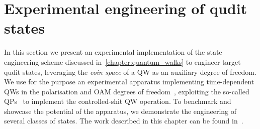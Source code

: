 
\chapter{Experimental engineering of qudit states}
\label{chapter:experimental_engineering_qudits}

 In this section we present an experimental implementation of the state engineering scheme discussed in~\cref{chapter:quantum_walks} to engineer target qudit states, leveraging the \emph{coin space} of a \ac{QW} as an auxiliary degree of freedom.
We use for the purpose an experimental apparatus implementing time-dependent \acp{QW} in the polarisation and \ac{OAM} degrees of freedom~\cite{zhang2010implementation,goyal2013implementing,cardano2015quantum}, exploiting the so-called \acp{QP}~\cite{marrucci2006optical} to implement the controlled-shit QW operation.
To benchmark and showcase the potential of the apparatus, we demonstrate the engineering of several classes of states.
The work described in this chapter can be found in~\cite{giordani2019experimental}.




